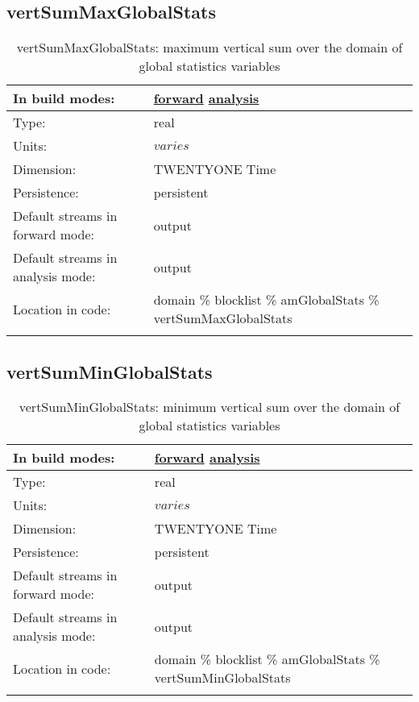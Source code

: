 \subsection[vertSumMaxGlobalStats]{vertSumMaxGlobalStats}
\label{subsec:var_sec_amGlobalStats_vertSumMaxGlobalStats}
\begin{center}
\begin{longtable}{| p{2.0in} | p{4.0in} |}
        \hline 
        In build modes: & \hyperref[subsec:forward_var_tab_amGlobalStats]{forward} \hyperref[subsec:analysis_var_tab_amGlobalStats]{analysis} \\
        \hline 
        Type: & real \\
        \hline 
        Units: & $varies$ \\
        \hline 
        Dimension: & TWENTYONE Time \\
        \hline 
        Persistence: & persistent \\
        \hline 
		 Default streams in forward mode: &  output \\
        \hline 
		 Default streams in analysis mode: &  output \\
        \hline 
		 Location in code: & domain \% blocklist \% amGlobalStats \% vertSumMaxGlobalStats \\
		 \hline 
    \caption{vertSumMaxGlobalStats: maximum vertical sum over the domain of global statistics variables}
\end{longtable}
\end{center}
\subsection[vertSumMinGlobalStats]{vertSumMinGlobalStats}
\label{subsec:var_sec_amGlobalStats_vertSumMinGlobalStats}
\begin{center}
\begin{longtable}{| p{2.0in} | p{4.0in} |}
        \hline 
        In build modes: & \hyperref[subsec:forward_var_tab_amGlobalStats]{forward} \hyperref[subsec:analysis_var_tab_amGlobalStats]{analysis} \\
        \hline 
        Type: & real \\
        \hline 
        Units: & $varies$ \\
        \hline 
        Dimension: & TWENTYONE Time \\
        \hline 
        Persistence: & persistent \\
        \hline 
		 Default streams in forward mode: &  output \\
        \hline 
		 Default streams in analysis mode: &  output \\
        \hline 
		 Location in code: & domain \% blocklist \% amGlobalStats \% vertSumMinGlobalStats \\
		 \hline 
    \caption{vertSumMinGlobalStats: minimum vertical sum over the domain of global statistics variables}
\end{longtable}
\end{center}
